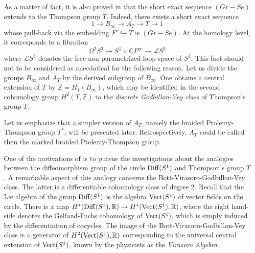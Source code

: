 \documentclass[twoside]{irmaems}
\theoremstyle{plain}
\theoremstyle{definition}
\theoremstyle{remark}
\newcommand{\Z}{{\mathbb{Z}}}
\newcommand{\C}{{\mathbb{C}}}
\newcommand{\R}{{\mathbb{R}}}
\begin{document}
\vspace{0.1cm}\noindent 
As a matter of fact, it is also proved in \cite{gr-se} that the short exact sequence $(Gr-Se)$ extends to the Thompson group $T$.
Indeed, there exists a short exact sequence  $$ 1\rightarrow B_{\infty}\longrightarrow A_T\longrightarrow T\rightarrow 1$$ whose pull-back via the embedding $F'\hookrightarrow T$ is $(Gr-Se)$. At the homology level, it corresponds 
to a fibration 
\[ \Omega^2 S^3 \to S^3\times \C P^{\infty} \to {\mathcal L}S^3\]
where ${\mathcal L}S^3$ denotes the free non-parametrized loop space of $S^3$.
This fact should not to be considered as anecdotical for the following reason. Let us divide
the groups $B_{\infty}$ and $A_T$ by the derived subgroup of  $B_{\infty}$. One obtains
a central extension of $T$ by $\Z=H_1(B_{\infty})$, which may be identified in the second cohomology group 
 $H^2(T,\Z)$ to the {\it discrete Godbillon-Vey class} of Thompson's group $T$.

\vspace{0.1cm}\noindent 
Let us emphasize that a simpler version of $A_T$, namely the 
braided Ptolemy-Thompson group $T^*$, will be presented later. Retrospectively, 
$A_T$ could be called then the marked braided Ptolemy-Thompson group. 

\vspace{0.1cm}\noindent 
One of the motivations of \cite{ka-se} is to pursue the investigations 
about the analogies between the diffeomorphism group of the circle ${\rm Diff}(S^1)$ and Thompson's group $T$. 
A remarkable aspect of this analogy concerns the Bott-Virasoro-Godbillon-Vey class. The latter 
is a differentiable cohomology class of degree 2. Recall that the Lie algebra of the group ${\rm Diff}(S^1)$ 
is the algebra  ${\rm Vect}(S^1)$ of vector fields on the circle. 
There is a map  $H^*({\rm Diff}(S^1),\R)\rightarrow H^*({\rm Vect}(S^1),\R)$, where the right hand-side denotes the Gelfand-Fuchs cohomology of ${\rm Vect}(S^1)$, which  is simply induced by the differentiation of cocycles. The image of the Bott-Virasoro-Godbillon-Vey class  is a generator of $H^2({\rm Vect}(S^1),\R)$ corresponding to the universal central extension 
of ${\rm Vect}(S^1)$, known by the physicists as the {\it Virasoro Algebra}.
\end{document}
